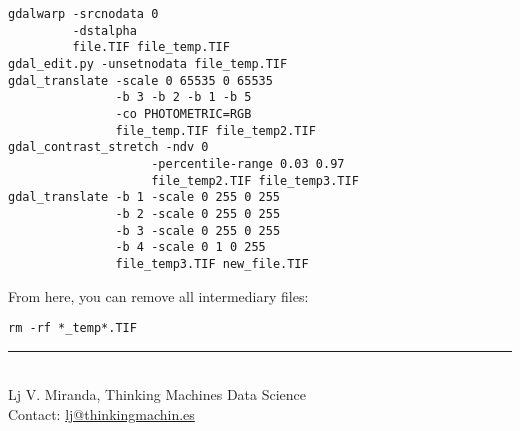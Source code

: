 \documentclass[10pt,landscape]{article}
\begin{document}
\begin{multicols}{3}
\begin{lstlisting}
gdalwarp -srcnodata 0 
         -dstalpha 
         file.TIF file_temp.TIF
gdal_edit.py -unsetnodata file_temp.TIF
gdal_translate -scale 0 65535 0 65535 
               -b 3 -b 2 -b 1 -b 5 
               -co PHOTOMETRIC=RGB
               file_temp.TIF file_temp2.TIF
gdal_contrast_stretch -ndv 0 
                    -percentile-range 0.03 0.97 
                    file_temp2.TIF file_temp3.TIF
gdal_translate -b 1 -scale 0 255 0 255 
               -b 2 -scale 0 255 0 255 
               -b 3 -scale 0 255 0 255 
               -b 4 -scale 0 1 0 255 
               file_temp3.TIF new_file.TIF
\end{lstlisting}

From here, you can remove all intermediary files:

\begin{lstlisting}
rm -rf *_temp*.TIF
\end{lstlisting}

\nocite{*}


    
\vfill
\hrule
~\\
Lj V. Miranda, Thinking Machines Data Science\\
Contact: \href{mailto:lj@thinkingmachin.es}{lj@thinkingmachin.es}
\end{multicols}
\end{document}
